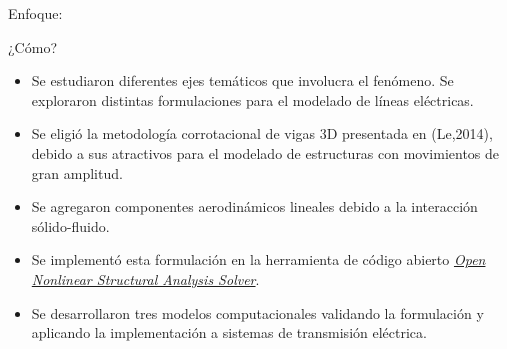 \documentclass[
  aspectratio=169,
]{beamer}
\begin{document}
\begin{small}
\begin{frame}{Enfoque:}{}
	\begin{block}{¿Cómo?}
		\begin{itemize}
			\item Se estudiaron diferentes ejes temáticos que involucra el fenómeno. Se exploraron distintas formulaciones para el modelado de líneas eléctricas. 
			\item Se eligió la metodología corrotacional de vigas 3D presentada en {\color{blue}(Le,2014)}, debido a sus atractivos para el modelado de estructuras con movimientos de gran amplitud.

			\item Se agregaron componentes aerodinámicos lineales debido a la interacción sólido-fluido.
			\item Se implementó esta formulación en la herramienta de código abierto \href{https://github.com/ONSAS/ONSAS.m}{\emph{Open Nonlinear Structural Analysis Solver}}.
			\item Se desarrollaron tres modelos computacionales validando la formulación y aplicando la implementación a sistemas de transmisión eléctrica.  
		\end{itemize}
	\end{block}	
\end{frame}

\end{small}
\end{document}
